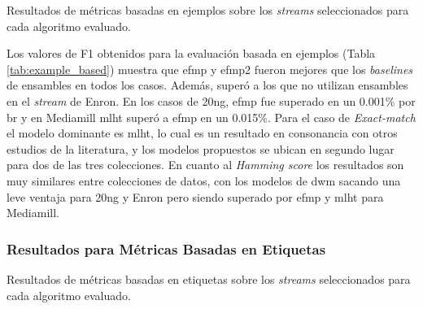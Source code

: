 \begin{table}[htbp]
	\centering
	\begin{adjustbox}{max width=\textwidth}
		
	\end{adjustbox}
	\begin{adjustbox}{max width=\textwidth}
		
	\end{adjustbox}
	\caption{Resultados de métricas basadas en ejemplos sobre los
		\textit{streams} seleccionados para cada algoritmo evaluado.}
	\label{tab:example_based}
\end{table}

Los valores de F1 obtenidos para la evaluación basada en ejemplos (Tabla
\ref{tab:example_based}) muestra que \acrshort{efmp} y \acrshort{efmp2} fueron
mejores que los \textit{baselines} de ensambles en todos los casos.  Además,
superó a los que no utilizan ensambles en el \textit{stream} de Enron.  En los
casos de 20ng, \acrshort{efmp} fue superado en un 0.001\% por \acrshort{br} y en
Mediamill \acrshort{mlht} superó a \acrshort{efmp} en un 0.015\%. Para el caso
de \textit{Exact-match} el modelo dominante es \acrshort{mlht}, lo cual es un
resultado en consonancia con otros estudios de la literatura, y los modelos
propuestos se ubican en segundo lugar para dos de las tres colecciones. En
cuanto al \textit{Hamming score} los resultados son muy similares entre
colecciones de datos, con los modelos de \acrshort{dwm} sacando una leve ventaja
para 20ng y Enron pero siendo superado por \acrshort{efmp} y \acrshort{mlht}
para Mediamill.

\subsubsection{Resultados para Métricas Basadas en Etiquetas}

\begin{table}[htbp]
	\centering
	\begin{adjustbox}{max width=\textwidth}
		
	\end{adjustbox}
	\begin{adjustbox}{max width=\textwidth}
		
	\end{adjustbox}
	\caption{Resultados de métricas basadas en etiquetas sobre los
		\textit{streams} seleccionados para cada algoritmo evaluado.}
	\label{tab:label_based}
\end{table}

